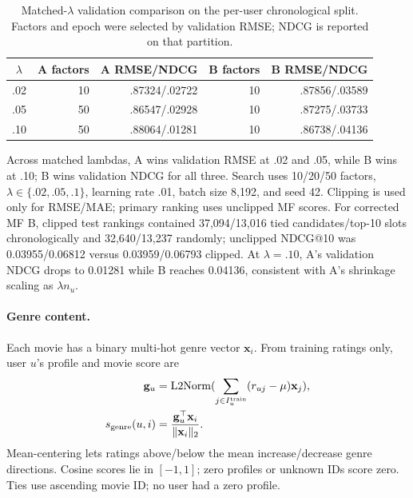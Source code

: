 \documentclass{article}
\begin{document}
\begin{table}[!ht]
\centering
\caption{Matched-$\lambda$ validation comparison on the per-user
chronological split. Factors and epoch were selected by validation RMSE; NDCG
is reported on that partition.}
\label{tab:matched}
\scriptsize
\setlength{\tabcolsep}{3pt}
\begin{tabular}{crrrr}
\toprule
$\lambda$ & A factors & A RMSE/NDCG & B factors & B RMSE/NDCG\\
\midrule
.02 & 10 & .87324/.02722 & 10 & .87856/.03589\\
.05 & 50 & .86547/.02928 & 10 & .87275/.03733\\
.10 & 50 & .88064/.01281 & 10 & .86738/.04136\\
\bottomrule
\end{tabular}
\end{table}
Across matched lambdas, A wins validation RMSE at .02 and .05, while B wins
at .10; B wins validation NDCG for all three. Search uses 10/20/50 factors, $\lambda\in\{.02,.05,.1\}$, learning rate .01,
batch size 8,192, and seed 42. Clipping is used only for RMSE/MAE; primary
ranking uses unclipped MF scores. For corrected MF B, clipped test rankings
contained 37,094/13,016 tied candidates/top-10 slots chronologically and
32,640/13,237 randomly; unclipped NDCG@10 was 0.03955/0.06812 versus
0.03959/0.06793 clipped.
At $\lambda=.10$, A's validation NDCG drops to 0.01281 while B reaches
0.04136, consistent with A's shrinkage scaling as $\lambda n_u$.

\paragraph{Genre content.}
Each movie has a binary multi-hot genre vector $\mathbf x_i$. From training
ratings only, user $u$'s profile and movie score are
\begin{equation}
 \begin{aligned}
 \mathbf g_u&=\mathrm{L2Norm}(\sum_{j\in I_u^{\rm train}}
       (r_{uj}-\mu)\mathbf x_j),\\
 s_{\rm genre}(u,i)&=\frac{\mathbf g_u^\top\mathbf x_i}{\|\mathbf x_i\|_2}.
 \end{aligned}
\end{equation}
Mean-centering lets ratings above/below the mean increase/decrease genre
directions. Cosine scores lie in $[-1,1]$; zero profiles or unknown IDs score
zero. Ties use ascending movie ID; no user had a zero profile.
\end{document}
